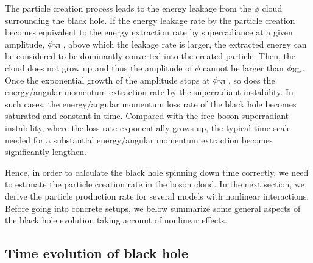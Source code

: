 \documentclass[%
 preprint,
 nofootinbib,
 amsmath,amssymb,
 aps,
 a4paper
]{revtex4-1}
\begin{document}
The particle creation process leads to the energy leakage from the $\phi$ cloud surrounding the black hole.
If the energy leakage rate by the particle creation becomes equivalent to the energy extraction rate by superradiance at a given amplitude, $\phi_{\rm NL}$, above which the leakage rate is larger, the extracted energy can be considered to be dominantly converted into the created particle. Then, the cloud does not grow up and thus the amplitude of $\phi$ cannot be larger than $\phi_{\rm NL}$. 
Once the exponential growth of the amplitude stops at $\phi_{\rm NL}$, so does the energy/angular momentum extraction rate by the superradiant instability. In such cases, the energy/angular momentum loss rate of the black hole becomes saturated and constant in time. Compared with the free boson superradiant instability, where the loss rate exponentially grows up, the typical time scale needed for a substantial energy/angular momentum extraction becomes significantly lengthen.

Hence, in order to calculate the black hole spinning down time correctly, we need to estimate the particle creation rate in the boson cloud. In the next section, we derive the particle production rate for several models with nonlinear interactions.
Before going into concrete setups, we below summarize some general aspects of the black hole evolution taking account of nonlinear effects. 



\subsection{Time evolution of black hole}
\end{document}
